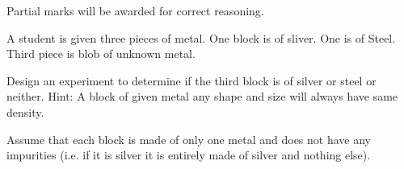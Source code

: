 \documentclass[12pt,addpoints]{exam}
\begin{document}
\begin{questions}
\begin{enumerate}
 \end{enumerate}

Partial marks will be awarded for correct reasoning.

\question[10]
A student is given three pieces of metal. One block is of sliver. One is of Steel. Third piece is blob of unknown metal.

Design an experiment to determine if the third block is of silver or steel or neither. Hint: A block of given metal any shape and size will always have same density.

Assume that each block is made of only one metal and does not have any impurities (i.e. if it is silver it is entirely made of silver and nothing else).



\newpage



\newpage

\end{questions}
\end{document}
